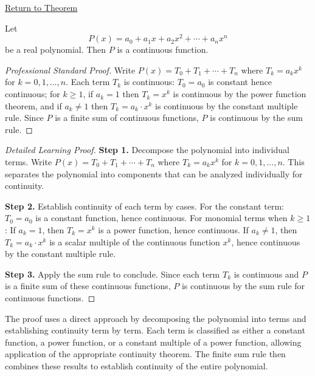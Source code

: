 \newpage
{}
\label{prf:polynomials-are-continuous}

\begin{remark*}[Return]
\hyperref[thm:polynomials-are-continuous]{Return to Theorem}
\end{remark*}

\begin{theorem*}
Let
\[
  P(x) = a_0 + a_1 x + a_2 x^2 + \cdots + a_n x^n
\]
be a real polynomial. Then $P$ is a continuous function.
\end{theorem*}

\begin{proof}[Professional Standard Proof]
\LRAProofBodyStart
Write $P(x) = T_0 + T_1 + \cdots + T_n$ where $T_k = a_k x^k$ for $k = 0, 1, \ldots, n$. Each term $T_k$ is continuous: $T_0 = a_0$ is constant hence continuous; for $k \geq 1$, if $a_k = 1$ then $T_k = x^k$ is continuous by the power function theorem, and if $a_k \neq 1$ then $T_k = a_k \cdot x^k$ is continuous by the constant multiple rule. Since $P$ is a finite sum of continuous functions, $P$ is continuous by the sum rule.
\end{proof}

\begin{proof}[Detailed Learning Proof]
\LRAProofBodyStart

\textbf{Step 1.} Decompose the polynomial into individual terms.
Write $P(x) = T_0 + T_1 + \cdots + T_n$ where $T_k = a_k x^k$ for $k = 0, 1, \ldots, n$. This separates the polynomial into components that can be analyzed individually for continuity.

\textbf{Step 2.} Establish continuity of each term by cases.
For the constant term: $T_0 = a_0$ is a constant function, hence continuous.
For monomial terms when $k \geq 1$: If $a_k = 1$, then $T_k = x^k$ is a power function, hence continuous. If $a_k \neq 1$, then $T_k = a_k \cdot x^k$ is a scalar multiple of the continuous function $x^k$, hence continuous by the constant multiple rule.

\textbf{Step 3.} Apply the sum rule to conclude.
Since each term $T_k$ is continuous and $P$ is a finite sum of these continuous functions, $P$ is continuous by the sum rule for continuous functions.
\end{proof}

\begin{remark*}
The proof uses a direct approach by decomposing the polynomial into terms and establishing continuity term by term. Each term is classified as either a constant function, a power function, or a constant multiple of a power function, allowing application of the appropriate continuity theorem. The finite sum rule then combines these results to establish continuity of the entire polynomial.
\end{remark*}

